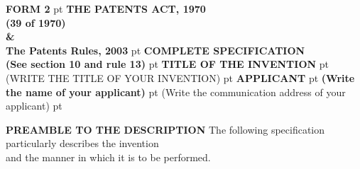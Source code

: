 



\begin{center}
	
	\thispagestyle{empty} 
	\textbf{FORM 2} 
	 pt 
	\textbf{THE PATENTS ACT, 1970}\\
	\textbf{(39 of 1970)}\\
	\textbf{\&}\\
	\textbf{The Patents Rules, 2003}
	 pt
	\textbf{COMPLETE SPECIFICATION}\\
	\textbf{(See section 10 and rule 13)}
	 pt
	\MakeUppercase{\textbf{Title of the Invention}}
	 pt
	\MakeUppercase
	{ 
			(Write the title of your invention) 
	}
	 pt
	\MakeUppercase{\textbf{Applicant}}
	 pt
	\textbf
	{
			(Write the name of your applicant) 
	}
	 pt
	{	
			(Write the communication address of your applicant)
	} 
	 pt

	\vspace*{\fill}
	\MakeUppercase{\textbf{Preamble to the description}}
	\vskip 10pt
	The following specification particularly describes the invention \\and the manner in which it is to be performed.
	
\end{center}

